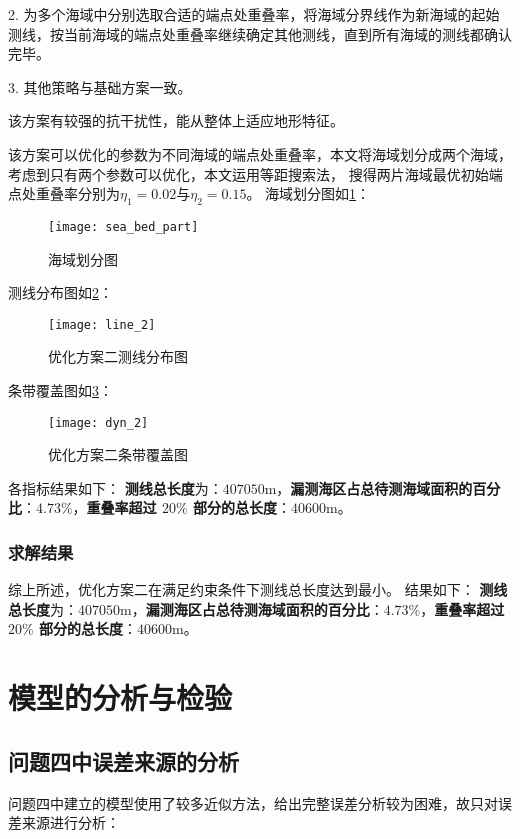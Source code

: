 \documentclass[withoutpreface,bwprint]{cumcmthesis} %
\begin{document}
        2. 为多个海域中分别选取合适的端点处重叠率，将海域分界线作为新海域的起始测线，按当前海域的端点处重叠率继续确定其他测线，直到所有海域的测线都确认完毕。

        3. 其他策略与基础方案一致。

        该方案有较强的抗干扰性，能从整体上适应地形特征。

        该方案可以优化的参数为不同海域的端点处重叠率，本文将海域划分成两个海域，考虑到只有两个参数可以优化，本文运用等距搜索法，
        搜得两片海域最优初始端点处重叠率分别为$\eta_1 = 0.02$与$\eta_2 = 0.15$。
        海域划分图如\cref{fig:sea_bed_part}：
        \begin{figure}[H]
            \centering
            \texttt{[image: sea\_bed\_part]}
            \caption{海域划分图}
            \label{fig:sea_bed_part}
        \end{figure}
        测线分布图如\cref{fig:line_2}：
        \begin{figure}[H]
            \centering
            \texttt{[image: line\_2]}
            \caption{优化方案二测线分布图}
            \label{fig:line_2}
        \end{figure}
        条带覆盖图如\cref{fig:dyn_2}：
        \begin{figure}[H]
            \centering
            \texttt{[image: dyn\_2]}
            \caption{优化方案二条带覆盖图}
            \label{fig:dyn_2}
        \end{figure}
        各指标结果如下：
        \textbf{测线总长度}为：$407050$m，\textbf{漏测海区占总待测海域面积的百分比}：$4.73\%$，\textbf{重叠率超过 $20\%$ 部分的总长度}：$40600$m。

        \subsubsection{求解结果}
        综上所述，优化方案二在满足约束条件下测线总长度达到最小。
        结果如下：
        \textbf{测线总长度}为：$407050$m，\textbf{漏测海区占总待测海域面积的百分比}：$4.73\%$，\textbf{重叠率超过 $20\%$ 部分的总长度}：$40600$m。

        \section{模型的分析与检验}
        \subsection{问题四中误差来源的分析}
        问题四中建立的模型使用了较多近似方法，给出完整误差分析较为困难，故只对误差来源进行分析：
\end{document}

